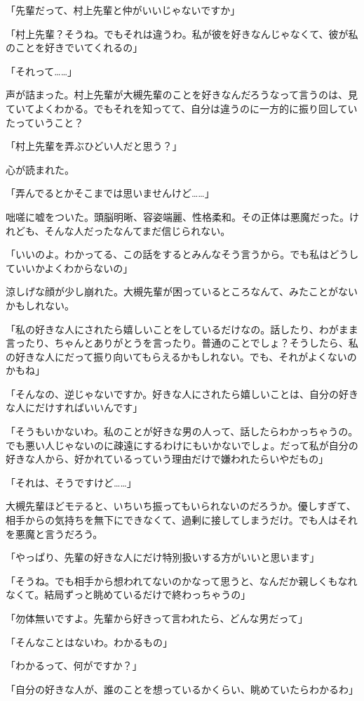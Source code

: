 \documentclass[a4paper,dvipdfmx,12pt]{jsarticle}
\begin{document}
「先輩だって、村上先輩と仲がいいじゃないですか」

「村上先輩？そうね。でもそれは違うわ。私が彼を好きなんじゃなくて、彼が私のことを好きでいてくれるの」

「それって……」

声が詰まった。村上先輩が大槻先輩のことを好きなんだろうなって言うのは、見ていてよくわかる。でもそれを知ってて、自分は違うのに一方的に振り回していたっていうこと？

「村上先輩を弄ぶひどい人だと思う？」

心が読まれた。

「弄んでるとかそこまでは思いませんけど……」

咄嗟に嘘をついた。頭脳明晰、容姿端麗、性格柔和。その正体は悪魔だった。けれども、そんな人だったなんてまだ信じられない。

「いいのよ。わかってる、この話をするとみんなそう言うから。でも私はどうしていいかよくわからないの」

涼しげな顔が少し崩れた。大槻先輩が困っているところなんて、みたことがないかもしれない。

「私の好きな人にされたら嬉しいことをしているだけなの。話したり、わがまま言ったり、ちゃんとありがとうを言ったり。普通のことでしょ？そうしたら、私の好きな人にだって振り向いてもらえるかもしれない。でも、それがよくないのかもね」

「そんなの、逆じゃないですか。好きな人にされたら嬉しいことは、自分の好きな人にだけすればいいんです」

「そうもいかないわ。私のことが好きな男の人って、話したらわかっちゃうの。でも悪い人じゃないのに疎遠にするわけにもいかないでしょ。だって私が自分の好きな人から、好かれているっていう理由だけで嫌われたらいやだもの」

「それは、そうですけど……」

大槻先輩ほどモテると、いちいち振ってもいられないのだろうか。優しすぎて、相手からの気持ちを無下にできなくて、過剰に接してしまうだけ。でも人はそれを悪魔と言うだろう。

「やっぱり、先輩の好きな人にだけ特別扱いする方がいいと思います」

「そうね。でも相手から想われてないのかなって思うと、なんだか親しくもなれなくて。結局ずっと眺めているだけで終わっちゃうの」

「勿体無いですよ。先輩から好きって言われたら、どんな男だって」

「そんなことはないわ。わかるもの」

「わかるって、何がですか？」

「自分の好きな人が、誰のことを想っているかくらい、眺めていたらわかるわ」
\end{document}
